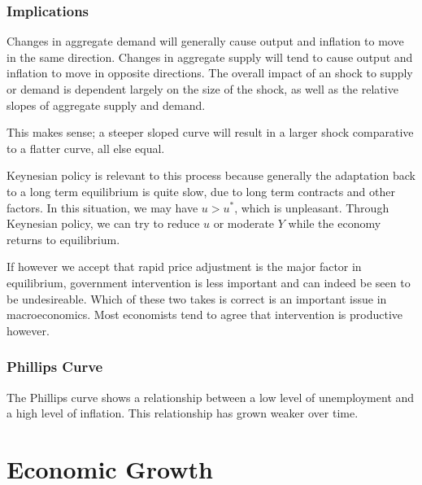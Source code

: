 \documentclass[12pt]{report}
\begin{document}
\begin{flushleft}
\subsubsection*{Implications}

Changes in aggregate demand will generally cause output and inflation to move
in the same direction. Changes in aggregate supply will tend to cause output
and inflation to move in opposite directions. The overall impact of an shock to
supply or demand is dependent largely on the size of the shock, as well as the
relative slopes of aggregate supply and demand. \par
This makes sense; a steeper sloped curve will result in a larger shock
comparative to a flatter curve, all else equal. \par
Keynesian policy is relevant to this process because generally the adaptation
back to a long term equilibrium is quite slow, due to long term contracts and
other factors. In this situation, we may have \(u > u^*\), which is unpleasant.
Through Keynesian policy, we can try to reduce \(u\) or moderate \(Y\) while
the economy returns to equilibrium. \par
If however we accept that rapid price adjustment is the major factor in
equilibrium, government intervention is less important and can indeed be seen
to be undesireable. Which of these two takes is correct is an important issue
in macroeconomics. Most economists tend to agree that intervention is
productive however.

\subsubsection*{Phillips Curve}

The Phillips curve shows a relationship between a low level of unemployment and
a high level of inflation. This relationship has grown weaker over time.

\section*{Economic Growth}


\end{flushleft}
\end{document}
